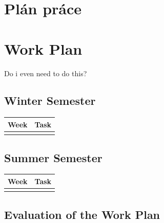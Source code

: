 \thispagestyle{empty}

\ifx\FIITlagEN\undefined
	\chapter{Plán práce}
\else
	\chapter{Work Plan}
\fi

\renewcommand*{\thepage}{B-\arabic{page}}

Do i even need to do this?
\section{Winter Semester}

\begin{tabular}{|l||l|}
	\hline
	Week & Task \\
	\hline
	     &      \\
	\hline
\end{tabular}

\section{Summer Semester}

\begin{tabular}{|l||l|}
	\hline
	Week & Task \\
	\hline
	     &      \\
	\hline
\end{tabular}

\section{Evaluation of the Work Plan}

